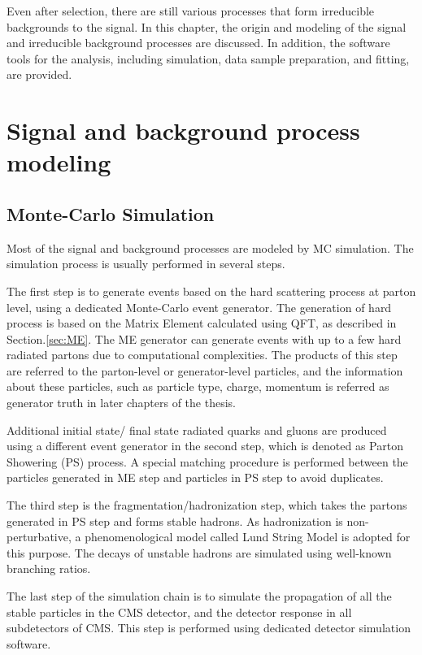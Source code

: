 Even after selection, there are still various processes that form irreducible backgrounds to the signal. In this chapter, the origin and modeling of the signal and irreducible background processes are discussed. In addition, the software tools for the analysis, including simulation, data sample preparation, and fitting, are provided.


\section{Signal and background process modeling}

\subsection{Monte-Carlo Simulation}
Most of the signal and background processes are modeled by MC simulation. The simulation process is usually performed in several steps. 

The first step is to generate events based on the hard scattering process at parton level, using a dedicated Monte-Carlo event generator. The generation of hard process is based on the Matrix Element calculated using QFT, as described in Section.\ref{sec:ME}. The ME generator can generate events with up to a few hard radiated partons due to computational complexities. The products of this step are referred to the parton-level or generator-level particles, and the information about these particles, such as particle type, charge, momentum is referred as generator truth in later chapters of the thesis.

Additional initial state/ final state radiated quarks and gluons are produced using a different event generator in the second step, which is denoted as Parton Showering (PS) process. A special matching procedure is performed between the particles generated in ME step and particles in PS step to avoid duplicates. 

The third step is the fragmentation/hadronization step, which takes the partons generated in PS step and forms stable hadrons. As hadronization is non-perturbative, a phenomenological model called Lund String Model is adopted for this purpose. The decays of unstable hadrons are simulated using well-known branching ratios. 

The last step of the simulation chain is to simulate the propagation of all the stable particles in the CMS detector, and the detector response in all subdetectors of CMS. This step is performed using dedicated detector simulation software.

